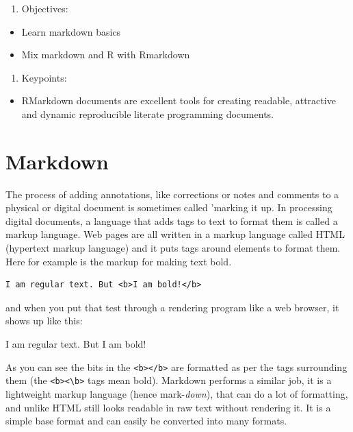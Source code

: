\documentclass[
]{book}
\providecommand{\tightlist}{%
  \setlength{\itemsep}{0pt}\setlength{\parskip}{0pt}}
\begin{document}
\begin{enumerate}
\def\labelenumi{\arabic{enumi}.}
\setcounter{enumi}{1}
\tightlist
\item
  Objectives:
\end{enumerate}

\begin{itemize}
\tightlist
\item
  Learn markdown basics
\item
  Mix markdown and R with Rmarkdown
\end{itemize}

\begin{enumerate}
\def\labelenumi{\arabic{enumi}.}
\setcounter{enumi}{2}
\tightlist
\item
  Keypoints:
\end{enumerate}

\begin{itemize}
\tightlist
\item
  RMarkdown documents are excellent tools for creating readable, attractive and dynamic reproducible literate programming documents.
\end{itemize}

\hypertarget{markdown}{%
\section{Markdown}\label{markdown}}

The process of adding annotations, like corrections or notes and comments to a physical or digital document is sometimes called 'marking it up. In processing digital documents, a language that adds tags to text to format them is called a markup language. Web pages are all written in a markup language called HTML (hypertext markup language) and it puts tags around elements to format them. Here for example is the markup for making text bold.

\begin{verbatim}
I am regular text. But <b>I am bold!</b>
\end{verbatim}

and when you put that test through a rendering program like a web browser, it shows up like this:

I am regular text. But I am bold!

As you can see the bits in the \texttt{\textless{}b\textgreater{}\textless{}/b\textgreater{}} are formatted as per the tags surrounding them (the \texttt{\textless{}b\textgreater{}\textless{}\textbackslash{}b\textgreater{}} tags mean bold). Markdown performs a similar job, it is a lightweight markup language (hence mark-\emph{down}), that can do a lot of formatting, and unlike HTML still looks readable in raw text without rendering it. It is a simple base format and can easily be converted into many formats.
\end{document}
